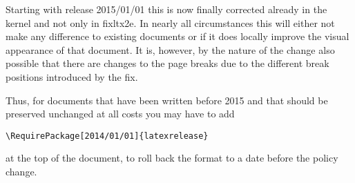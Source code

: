 \documentclass{ltnews}
\begin{document}
Starting with release 2015/01/01 this is now finally corrected already
in the kernel and not only in \textsf{fixltx2e}. In nearly all
circumstances this will either not make any difference to existing
documents or if it does locally improve the visual appearance of that
document. It is, however, by the nature of the change also possible
that there are changes to the page breaks due to the different break
positions introduced by the fix.

Thus, for documents that have been written before 2015 and that should
be preserved unchanged at all costs you may have to add
\begin{verbatim}
\RequirePackage[2014/01/01]{latexrelease}
\end{verbatim}
at the top of the document, to roll back the format to a date before
the policy change.
\end{document}

